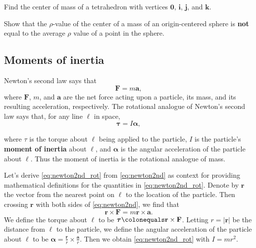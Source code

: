 \documentclass{watsonbook}
\begin{document}
\begin{exercise}{}{}
  Find the center of mass of a tetrahedron with vertices $\mathbf{0}$,
  $\mathbf{i}$, $\mathbf{j}$, and $\mathbf{k}$.
\end{exercise}

\begin{exercise}{}{}
  Show that the $\rho$-value of the center of a mass of an
  origin-centered sphere is \textbf{not} equal to the average $\rho$
  value of a point in the sphere.
\end{exercise}

\subsection{Moments of inertia} \label{sec:moments-inertia}

Newton's second law says that
\begin{equation} \label{eq:newton2nd} 
  \mathbf{F} = m \mathbf{a},
\end{equation}
where $\mathbf{F}$, $m$, and $\mathbf{a}$ are the net force acting upon a particle, its mass, and its resulting acceleration, respectively. The rotational analogue of Newton's second law says that, for any line $\ell$ in space, 
\begin{equation} \label{eq:newton2nd_rot} 
  {\bm \tau} = I {\bm \alpha}, 
\end{equation}
\begin{minipage}[t]{0.7\textwidth}
  where $\tau$ is the torque about $\ell$ being applied to the
  particle, $I$ is the particle's \textbf{moment of inertia} about
  $\ell$, and ${\bm \alpha}$ is the angular acceleration of the
  particle about $\ell$. Thus the moment of inertia is the rotational
  analogue of mass.
  
  Let's derive \eqref{eq:newton2nd_rot} from \eqref{eq:newton2nd} as context for providing mathematical definitions for the quantities in \eqref{eq:newton2nd_rot}. Denote by $\mathbf{r}$ the vector from the nearest point on $\ell$ to the location of the particle. Then crossing $\mathbf{r}$ with both sides of \eqref{eq:newton2nd}, we find that
\[
  \mathbf{r} \times \mathbf{F} = m \mathbf{r} \times \mathbf{a}. 
\]
We define the torque about $\ell$ to be ${\bm \tau} \colonequals
\mathbf{r} \times \mathbf{F}$. Letting $r = |\mathbf{r}|$ be the
distance from $\ell$ to the particle, we define the angular
acceleration of the particle about $\ell$ to be ${\bm \alpha} =
\frac{\mathbf{r}}{r} \times \frac{\mathbf{a}}{r}$. Then we obtain
\eqref{eq:newton2nd_rot} with $I = mr^2$.
\end{minipage}
\end{document}
